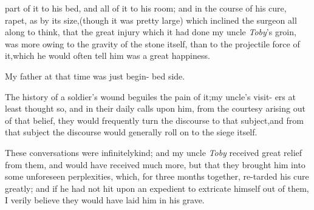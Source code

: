 \documentclass[twoside]{article}
\begin{document}
\noindent
{}
part of it to his bed, and all of it to his 
room; and in the course of his cure,\break
{}
rapet,\tsk
as by its size,\tsk (though it was pretty large) which inclined
the surgeon all along to think, that the great injury which it
had done my uncle \textit{Toby}’s groin, was more owing to the
gravity of the stone itself, than to the projectile force of
it,\tsk which he would often tell him was a great happiness.

My father at that time was just begin-
bed side.

The history of a soldier’s wound beguiles the pain of
it;\tsk my uncle’s visit-\break
ers at least thought so, and in their daily\break
calls upon him, from the courtesy arising\break
out of that belief, they would frequently\break
turn the discourse to that subject,\tsk and\break
from that subject the discourse would\break
generally roll on to the siege itself.

These conversations were infinitely\break kind; and my uncle
\textit{Toby} received great relief from them, and would have
recei\-ved much more, but that they brought him into some unforeseen
perplexities, which, for three months together, re-\break tarded his
cure greatly; and if he had
not hit upon an
expedient to extricate himself out of them, I verily believe they
would have laid him in his grave.
\end{document}
